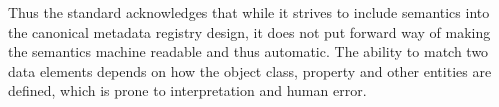 \documentclass[runningheads]{llncs}
\begin{document}
	Thus the standard acknowledges that while it strives to include semantics into the canonical metadata registry design, it does not put forward way of making the semantics machine readable and thus automatic. The ability to match two data elements depends on how the object class, property and other entities are defined, which is prone to interpretation and human error.
	
	
	
	
%	
%
\end{document}
